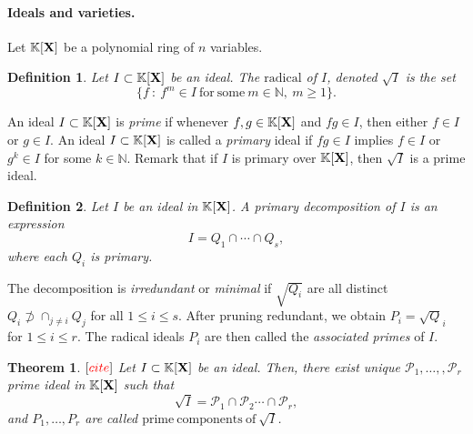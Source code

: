 \documentclass[11pt]{article}
\numberwithin{Property}{section}
\newtheorem{Theorem}{Theorem}%
\numberwithin{Theorem}{section}
\numberwithin{Proposition}{section}
\numberwithin{Lemma}{section}
\numberwithin{Corollary}{section}
\newtheorem{Definition}{Definition}%
\numberwithin{Definition}{section}
\numberwithin{Remark}{section}
\numberwithin{Conjecture}{section}
\numberwithin{Problem}{section}
\numberwithin{Claim}{section}
\theoremstyle{definition}
\numberwithin{Example}{section}
\renewcommand{\leq}{\leqslant}
\renewcommand{\geq}{\geqslant}
\newcommand{\field}{\mathbb{K}} %
\newcommand{\mat}[1]{\mathbf{\MakeUppercase{#1}}} %
\newcommand{\todo}[1]{\textcolor{red}{#1}} %
\begin{document}
\paragraph{Ideals and varieties.} Let $\field[\mat{X}]$ be a polynomial ring of $n$ variables. 
\begin{Definition} Let $I \subset \field[\mat{X}]$ be an ideal. The $\mathrm{radical}$ of $I$, denoted $\sqrt{I}$ is the set 
\[
\{f \ : \ f^m \in I \ \mathrm{for \ some} \ m \in \mathbb{N}, \ m \geq 1\}.
\]
\end{Definition}

An ideal $I \subset \field[\mat{X}]$ is \emph{prime} if whenever $f,g \in \field[\mat{X}]$ and $fg \in I$, then either $f \in I$ or $g \in I$. An ideal $I \subset \field[\mat{X}]$ is called a \emph{primary} ideal if $fg \in I$ implies $f \in I$ or $g^k \in I$ for some $k \in \mathbb{N}$. Remark that if $I$ is primary over $\field[\mat{X}]$, then $\sqrt{I}$ is a prime ideal. 
\begin{Definition}
Let $I$ be an ideal in $\field[\mat{X}]$. A \emph{primary decomposition} of $I$ is an expression 
\[
I = Q_1 \cap \cdots \cap Q_s,
\]
where each $Q_i$ is primary.
\end{Definition}
The decomposition is \emph{irredundant} or \emph{minimal} if $\sqrt{Q_i}$ are all distinct $Q_i \not \supset \cap_{j \ne i}Q_j$ for all $1 \leq i \leq s$. After pruning redundant,  we obtain $P_i = \sqrt{Q}_i$ for $1 \leq i \leq r$. The radical ideals $P_i$ are then called the \emph{associated primes} of $I$. 
\begin{Theorem}$[\todo{cite}]$ Let $I \subset \field[\mat{X}]$ be an ideal. Then, there exist unique $\mathcal{P}_1, \ldots,, \mathcal{P}_r$ prime ideal in $\field[\mat{X}]$ such that 
\[
\sqrt{I} = \mathcal{P}_1 \cap \mathcal{P}_2 \cdots \cap \mathcal{P}_r,
\]
and $P_1, \ldots, P_r$ are called $\mathrm{prime \ components \ of} \ \sqrt{I}$. 
\end{Theorem} 
\end{document}

